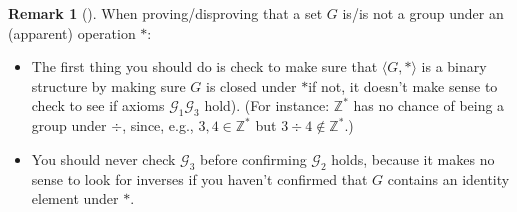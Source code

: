 \documentclass[10pt,]{book}
\theoremstyle{plain}
\theoremstyle{definition}
\theoremstyle{definition}
\newtheorem{remark}[theorem]{Remark}
\theoremstyle{definition}
\theoremstyle{definition}
\numberwithin{equation}{section}
\def\Z{\mathbb{Z}}
\def\G{\mathcal{G}}
\begin{document}
\begin{remark}[]\label{remark-7}
When proving/disproving that a set \(G\) is/is not a group under an (apparent) operation \(*\): \leavevmode%
\begin{itemize}[label=\textbullet]
\item{}The first thing you should do is check to make sure that  \(\langle G,*\rangle\) is a binary structure by making sure \(G\) is closed under \(*\)\textemdash{}if not, it doesn't make sense to check to see if axioms \(\G_1\)\textendash{}\(\G_3\) hold). (For instance: \(\Z^*\) has no chance of being a group under \(\div\), since, e.g., \(3,4\in \Z^*\) but \(3 \div 4 \not\in\Z^*\).)%
\item{}You should never check \(\G_3\) before confirming \(\G_2\) holds, because it makes no sense to look for inverses if you haven't confirmed that \(G\) contains an identity element under \(*\).%
\end{itemize}
%
\end{remark}
\typeout{************************************************}
\typeout{************************************************}
\end{document}
